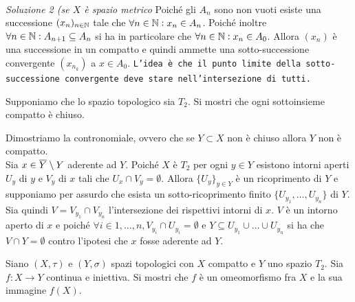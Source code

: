 \documentclass[a4paper]{article}\par \usepackage{style}\par
\begin{document}

\\
\emph{Soluzione 2 (se $ X $ è spazio metrico} Poiché gli $ A_n $ sono non vuoti esiste una successione $ (x_n)_{n \in \mathbb{N}} $ tale che $ \forall n \in \mathbb{N} : x_n \in A_n $. Poiché inoltre $ \forall n \in \mathbb{N} : A_{n + 1} \subseteq A_{n} $ si ha in particolare che $ \forall n \in \mathbb{N} : x_n \in A_0 $. Allora $ (x_n) $ è una successione in un compatto e quindi ammette una sotto-successione convergente $ (x_{n_k}) $ a $ x \in A_0 $. \texttt{L'idea è che il punto limite della sotto-successione convergente deve stare nell'intersezione di tutti.}\par \begin{es}
  Supponiamo che lo spazio topologico sia $ T_2 $. Si mostri che ogni sottoinsieme compatto è chiuso.
\end{es}\par Dimostriamo la contronomiale, ovvero che se $ Y \subset X $ non è chiuso allora $ Y $ non è compatto. \\ Sia $ x \in \overline{Y} \setminus Y $ aderente ad $ Y $. Poiché $ X $ è $ T_2 $ per ogni $ y \in Y $ esistono intorni aperti $ U_y $ di $ y $ e $ V_y $ di $ x $ tali che $ U_x \cap V_y = \emptyset $. Allora $ \{U_y\}_{y \in Y} $ è un ricoprimento di $ Y $ e supponiamo per assurdo che esista un sotto-ricoprimento finito $ \{U_{y_1}, \ldots, U_{y_n}\} $ di $ Y $. Sia quindi $ V = V_{y_1} \cap V_{y_n} $ l'intersezione dei rispettivi intorni di $ x $. $ V $ è un intorno aperto di $ x $ e poiché $ \forall i \in {1, \ldots, n}, V_{y_i} \cap U_{y_i} = \emptyset $ e $ Y \subseteq U_{y_1} \cup \ldots \cup U_{y_n} $ si ha che $ V \cap Y = \emptyset $ contro l'ipotesi che $ x $ fosse aderente ad $ Y $.\par \begin{es}
  Siano $ (X, \tau) $ e $ (Y, \sigma) $ spazi topologici con $ X $ compatto e $ Y $ uno spazio $ T_2 $. Sia $ f \colon X \to Y $ continua e iniettiva. Si mostri che $ f $ è un omeomorfismo fra $ X $ e la sua immagine $ f(X) $.

\end{es}
\end{document}
